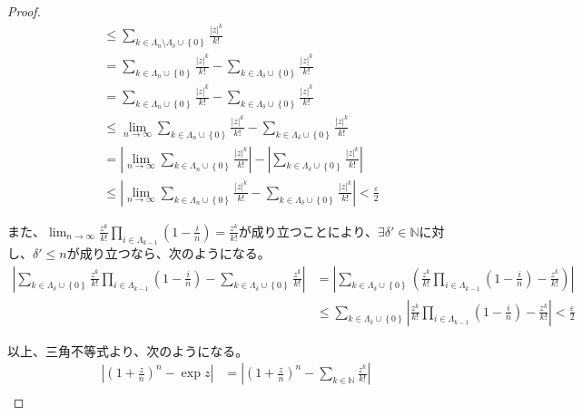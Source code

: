 \documentclass[dvipdfmx]{jsarticle}
\begin{document}
\begin{proof}
\begin{align*}
&\leq \sum_{k \in \varLambda_{n} \setminus \varLambda_{\delta} \cup \left\{ 0 \right\}} \frac{|z|^{k}}{k!}\\
&= \sum_{k \in \varLambda_{n} \cup \left\{ 0 \right\}} \frac{|z|^{k}}{k!} - \sum_{k \in \varLambda_{\delta} \cup \left\{ 0 \right\}} \frac{|z|^{k}}{k!}\\
&= \sum_{k \in \varLambda_{n} \cup \left\{ 0 \right\}} \frac{|z|^{k}}{k!} - \sum_{k \in \varLambda_{\delta} \cup \left\{ 0 \right\}} \frac{|z|^{k}}{k!}\\
&\leq \lim_{n \rightarrow \infty}{\sum_{k \in \varLambda_{n} \cup \left\{ 0 \right\}} \frac{|z|^{k}}{k!}} - \sum_{k \in \varLambda_{\delta} \cup \left\{ 0 \right\}} \frac{|z|^{k}}{k!}\\
&= \left| \lim_{n \rightarrow \infty}{\sum_{k \in \varLambda_{n} \cup \left\{ 0 \right\}} \frac{|z|^{k}}{k!}} \right| - \left| \sum_{k \in \varLambda_{\delta} \cup \left\{ 0 \right\}} \frac{|z|^{k}}{k!} \right|\\
&\leq \left| \lim_{n \rightarrow \infty}{\sum_{k \in \varLambda_{n} \cup \left\{ 0 \right\}} \frac{|z|^{k}}{k!}} - \sum_{k \in \varLambda_{\delta} \cup \left\{ 0 \right\}} \frac{|z|^{k}}{k!} \right| < \frac{\varepsilon}{2}
\end{align*}\par
また、$\lim_{n \rightarrow \infty}{\frac{z^{k}}{k!}\prod_{i \in \varLambda_{k - 1}} \left( 1 - \frac{i}{n} \right)} = \frac{z^{k}}{k!}$が成り立つことにより、$\exists\delta' \in \mathbb{N}$に対し、$\delta' \leq n$が成り立つなら、次のようになる。
\begin{align*}
\left| \sum_{k \in \varLambda_{\delta} \cup \left\{ 0 \right\}} {\frac{z^{k}}{k!}\prod_{i \in \varLambda_{k - 1}} \left( 1 - \frac{i}{n} \right)} - \sum_{k \in \varLambda_{\delta} \cup \left\{ 0 \right\}} \frac{z^{k}}{k!} \right| &= \left| \sum_{k \in \varLambda_{\delta} \cup \left\{ 0 \right\}} \left( \frac{z^{k}}{k!}\prod_{i \in \varLambda_{k - 1}} \left( 1 - \frac{i}{n} \right) - \frac{z^{k}}{k!} \right) \right|\\
&\leq \sum_{k \in \varLambda_{\delta} \cup \left\{ 0 \right\}} \left| \frac{z^{k}}{k!}\prod_{i \in \varLambda_{k - 1}} \left( 1 - \frac{i}{n} \right) - \frac{z^{k}}{k!} \right| < \frac{\varepsilon}{2}
\end{align*}\par
以上、三角不等式より、次のようになる。
\begin{align*}
\left| \left( 1 + \frac{z}{n} \right)^{n} - \exp z \right| &= \left| \left( 1 + \frac{z}{n} \right)^{n} - \sum_{k \in \mathbb{N}} \frac{z^{k}}{k!} \right|\\

\end{align*}
\end{proof}
\end{document}
